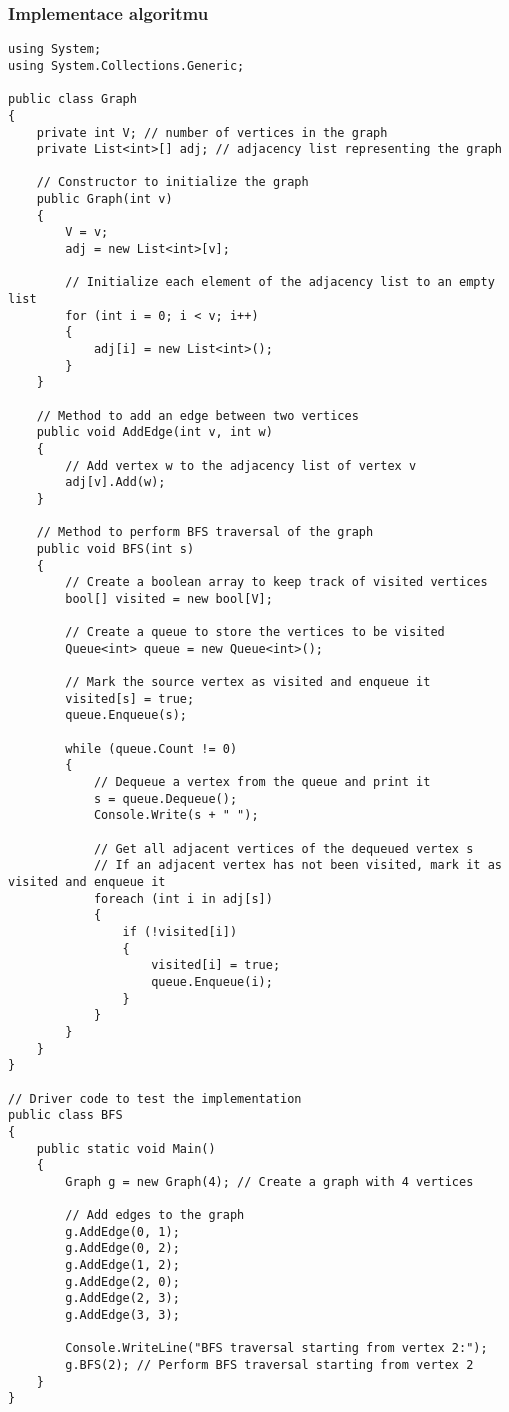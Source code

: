 \documentclass[12pt]{article}
\begin{document}
\subsubsection{Implementace algoritmu}

\begin{lstlisting}
using System;
using System.Collections.Generic;

public class Graph
{
    private int V; // number of vertices in the graph
    private List<int>[] adj; // adjacency list representing the graph

    // Constructor to initialize the graph
    public Graph(int v)
    {
        V = v;
        adj = new List<int>[v];

        // Initialize each element of the adjacency list to an empty list
        for (int i = 0; i < v; i++)
        {
            adj[i] = new List<int>();
        }
    }

    // Method to add an edge between two vertices
    public void AddEdge(int v, int w)
    {
        // Add vertex w to the adjacency list of vertex v
        adj[v].Add(w);
    }

    // Method to perform BFS traversal of the graph
    public void BFS(int s)
    {
        // Create a boolean array to keep track of visited vertices
        bool[] visited = new bool[V];

        // Create a queue to store the vertices to be visited
        Queue<int> queue = new Queue<int>();

        // Mark the source vertex as visited and enqueue it
        visited[s] = true;
        queue.Enqueue(s);

        while (queue.Count != 0)
        {
            // Dequeue a vertex from the queue and print it
            s = queue.Dequeue();
            Console.Write(s + " ");

            // Get all adjacent vertices of the dequeued vertex s
            // If an adjacent vertex has not been visited, mark it as visited and enqueue it
            foreach (int i in adj[s])
            {
                if (!visited[i])
                {
                    visited[i] = true;
                    queue.Enqueue(i);
                }
            }
        }
    }
}

// Driver code to test the implementation
public class BFS
{
    public static void Main()
    {
        Graph g = new Graph(4); // Create a graph with 4 vertices

        // Add edges to the graph
        g.AddEdge(0, 1);
        g.AddEdge(0, 2);
        g.AddEdge(1, 2);
        g.AddEdge(2, 0);
        g.AddEdge(2, 3);
        g.AddEdge(3, 3);

        Console.WriteLine("BFS traversal starting from vertex 2:");
        g.BFS(2); // Perform BFS traversal starting from vertex 2
    }
}
\end{lstlisting}
\end{document}
